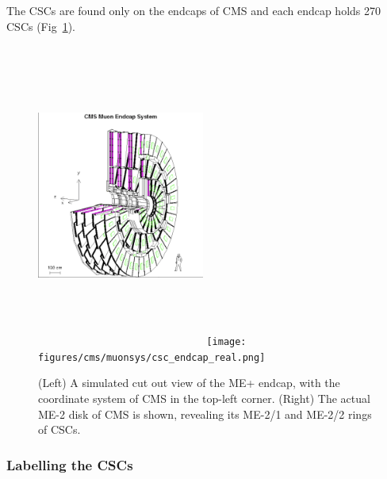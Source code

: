 The CSCs are found only on the endcaps of CMS and each endcap holds 270 CSCs (Fig~\ref{fig:cms_endcap}).
\begin{figure}[pbth]
    \centering
    \includegraphics[width=0.49\textwidth,height=10cm,keepaspectratio]{figures/cms/muonsys/csc_endcap_cutaway.png}
    \texttt{[image: figures/cms/muonsys/csc\_endcap\_real.png]}
        \caption{
        (Left) A simulated cut out view of the ME+ endcap, with the coordinate system of CMS in the top-left corner.
        (Right) The actual ME-2 disk of CMS is shown, revealing its ME-2/1 and ME-2/2 rings of CSCs.
        }
        \label{fig:cms_endcap}
    \end{figure}

\subsubsection{Labelling the CSCs} 

